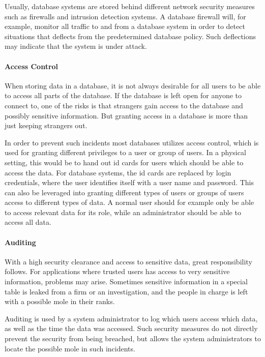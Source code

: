 Usually, database systems are stored behind different network security measures such as firewalls and intrusion detection systems. A database firewall will, for example, monitor all traffic to and from a database system in order to detect situations that deflects from the predetermined database policy. Such deflections may indicate that the system is under attack.


\paragraph{Access Control}

When storing data in a database, it is not always desirable for all users to be able to access all parts of the database. If the database is left open for anyone to connect to, one of the risks is that strangers gain access to the database and possibly sensitive information. But granting access in a database is more than just keeping strangers out.

In order to prevent such incidents most databases utilizes access control, which is used for granting different privileges to a user or group of users. In a physical setting, this would be to hand out id cards for users which should be able to access the data. For database systems, the id cards are replaced by login credentials, where the user identifies itself with a user name and password. This can also be leveraged into granting different types of users or groups of users access to different types of data. A normal user should for example only be able to access relevant data for its role, while an administrator should be able to access all data.

\paragraph{Auditing}

With a high security clearance and access to sensitive data, great responsibility follows. For applications where trusted users has access to very sensitive information, problems may arise. Sometimes sensitive information in a special table is leaked from a firm or an investigation, and the people in charge is left with a possible mole in their ranks.

Auditing is used by a system administrator to log which users access which data, as well as the time the data was accessed. Such security measures do not directly prevent the security from being breached, but allows the system administrators to locate the possible mole in such incidents. 


